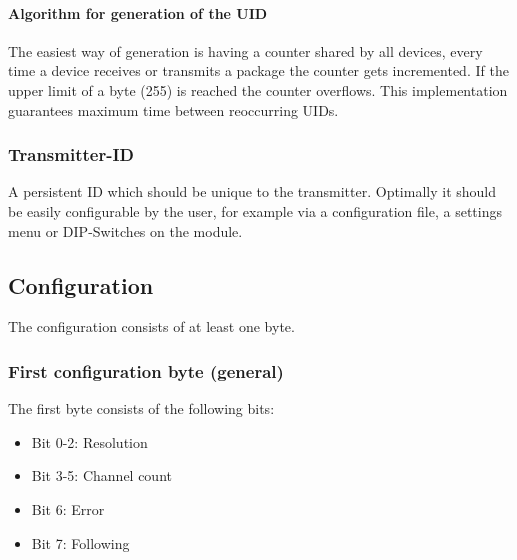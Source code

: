 \documentclass{report}
\begin{document}
    \paragraph{Algorithm for generation of the UID}
     The easiest way of generation is having a counter shared by all devices,
     every time a device receives or transmits a package the counter gets
     incremented. If the upper limit of a byte (255) is reached the counter
     overflows. This implementation guarantees maximum time between reoccurring
     UIDs.

    \subsubsection{Transmitter-ID}
     A persistent ID which should be unique to the transmitter. Optimally it
     should be easily configurable by the user, for example via a configuration
     file, a settings menu or DIP-Switches on the module.

  \subsection{Configuration}
    The configuration consists of at least one byte.

    \subsubsection{First configuration byte (general)}
     The first byte consists of the following bits:
     \begin{itemize}
       \item Bit 0-2: Resolution
       \item Bit 3-5: Channel count
       \item Bit 6: Error
       \item Bit 7: Following
     \end{itemize}
\end{document}
